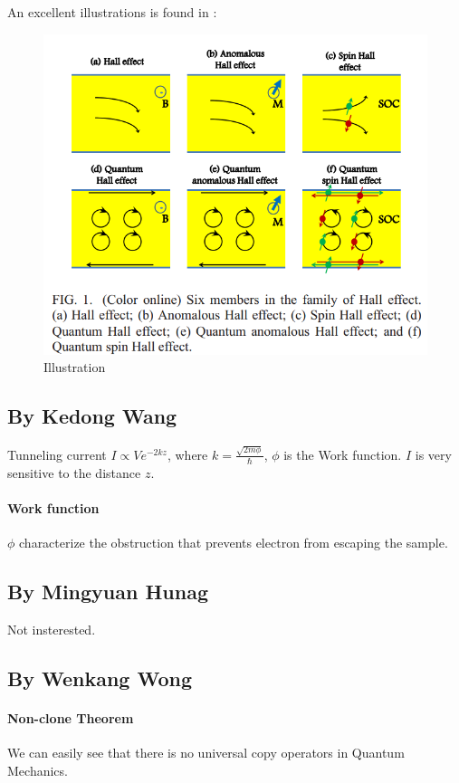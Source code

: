 \documentclass{article}
\numberwithin{equation}{subsection} %
\theoremstyle{definition}
\begin{document}
    An excellent illustrations is found in \cite{Arxiv-Xiao}:
    \begin{figure}[H]
        \centering
        \includegraphics[width=0.8\linewidth]{pics/1}
        \caption{Illustration}
        \label{fig:Xiao Illustration}
    \end{figure}

    \subsection{By Kedong Wang}
    Tunneling current $I\propto V e^{-2kz}$, where 
    $k = \frac{\sqrt{2m\phi}}{\hbar}$, $\phi$ is the Work function.
    $I$ is very sensitive to the distance $z$.
    
    \paragraph{Work function} $\phi$ characterize the obstruction
    that prevents electron from escaping the sample.

    \subsection{By Mingyuan Hunag}
    Not insterested.
    
    \subsection{By Wenkang Wong}
    \paragraph{Non-clone Theorem} We can easily see that there is no universal
    copy operators in Quantum Mechanics.
\end{document}
